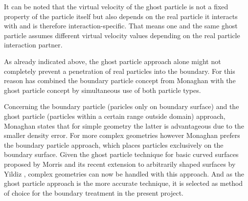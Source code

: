\documentclass[11pt,a4paper,twoside]{report}
\begin{document}
\begin{itemize}
\begin{itemize}
\end{itemize}
It can be noted that the virtual velocity of the ghost particle is not a fixed property of the particle itself but also depends on the real particle it interacts with and is therefore interaction-specific. That means one and the same ghost particle assumes different virtual velocity values depending on the real particle interaction partner.

\end{itemize}

As already indicated above, the ghost particle approach alone might not completely prevent a penetration of real particles into the boundary. For this reason \cite{Liu2002} has combined the boundary particle concept from Monaghan with the ghost particle concept by simultaneous use of both particle types.  %

Concerning the boundary particle (paricles only on boundary surface) and the ghost particle (particles within a certain range outside domain) approach, Monaghan \cite{Monaghan2005} states that for simple geometry the latter is advantageous due to the smaller density error. For more complex geometries however Monaghan prefers the boundary particle approach, which places particles exclusively on the boundary surface.
Given the ghost particle technique for basic curved surfaces proposed by Morris \cite{Morris1997, Zhu1999} and its recent extension to arbitrarily shaped surfaces by Yildiz \cite{Yildiz2009}, complex geometries can now be handled with this approach. And as the ghost particle approach is the more accurate technique, it is selected as method of choice for the boundary treatment in the present project.
\end{document}
